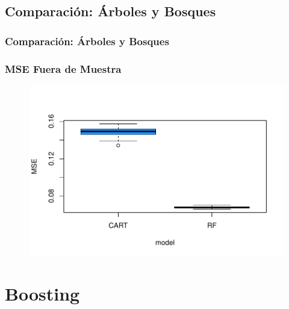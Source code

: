 \documentclass[
  shownotes,
  xcolor={svgnames},
  hyperref={colorlinks,citecolor=DarkBlue,linkcolor=DarkRed,urlcolor=DarkBlue}
  , aspectratio=169]{beamer}
\begin{document}
\subsection{Comparación: Árboles y Bosques}

\begin{frame}[fragile]
\frametitle{Comparación: Árboles y Bosques}
\frametitle{ MSE Fuera de Muestra}


\begin{figure}[H] \centering
            \captionsetup{justification=centering}
              \includegraphics[scale=.75]{figures/mse_tree.pdf}
 \end{figure}

\end{frame}


\section{Boosting}
\end{document}
